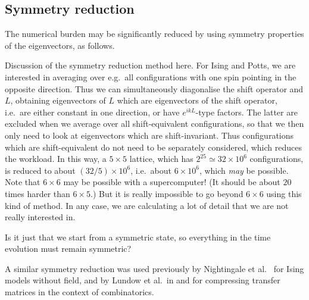 \documentclass[10pt]{article}
\newcommand{\Order}[1]{\mathcal{O}(#1)}
\newcommand{\comment}[1]{{\color{red}#1}}
\begin{document}
\subsection{Symmetry reduction}

The numerical burden may be significantly reduced by using
symmetry properties of the eigenvectors, as follows.

\comment{Discussion of the symmetry reduction method here.}
For
Ising and Potts, we are interested in averaging over e.g.\ all configurations
with one spin pointing in the opposite direction.  Thus we can simultaneously
diagonalise the shift operator and $L$, obtaining eigenvectors of $L$ which are
eigenvectors of the shift operator, i.e.\ are either constant in one direction,
or have $e^{ikL}$-type factors.  The latter are excluded when we average over
all shift-equivalent configurations, so that we then only need to look at
eigenvectors which are shift-invariant.  Thus configurations which are
shift-equivalent do not need to be separately considered, which reduces the
workload.  In this way, a $5 \times 5$ lattice, which has $2^{25} \simeq 32
\times 10^6$ configurations, is reduced to about $(32 / 5) \times 10^6$, i.e.\
about $6 \times 10^6$, which \emph{may} be possible.  Note that $6 \times 6$
may be possible with a supercomputer!  (It should be about $20$ times harder
than $6\times 5$.) But it is really impossible to go beyond $6 \times 6$ using
this kind of method. In any case, we are calculating a lot of detail that we
are not really interested in.

\comment{Is it just that we start from a symmetric state, so everything in the
time evolution must remain symmetric?}

A similar symmetry reduction was used previously by Nightingale et al.~
\cite{NightingaleCorrelationTimesCriticalityPRB2000} for Ising
models without
field, and by Lundow et al.~in
\cite{LundowCompressionTransferMatricesDiscMath2001} and
\cite{LundowExactApproxCompressionTransferMatricesLMSJCM2008} for compressing
transfer matrices in the context of combinatorics.



% 
% 
% 
% 
% 
\end{document}
